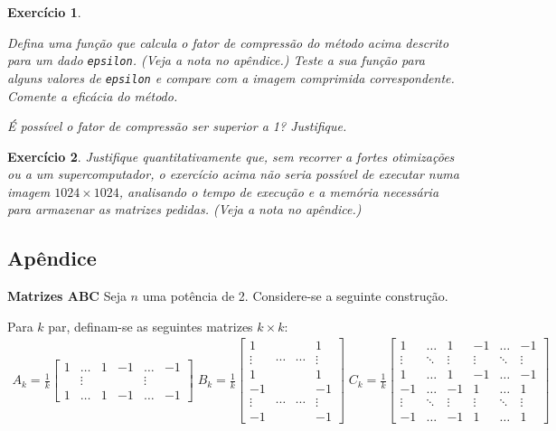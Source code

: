 \documentclass{article}
\newtheorem{ex}{Exercício}[section]
\begin{document}
\begin{ex}\label{exratio}

Defina uma função que calcula o fator de compressão do método acima descrito para um dado \texttt{epsilon}. (Veja a nota no apêndice.) Teste a sua função para alguns valores de \texttt{epsilon} e compare com a imagem comprimida correspondente. Comente a eficácia do método.

É possível o fator de compressão ser superior a 1? Justifique.
\end{ex}

\begin{ex}\label{experformance}
Justifique quantitativamente que, sem recorrer a fortes otimizações ou a um supercomputador, o exercício acima não seria possível de executar numa imagem $1024 \times 1024$, analisando o tempo de execução e a memória necessária para armazenar as matrizes pedidas. (Veja a nota no apêndice.) 

\end{ex}

\subsection{Apêndice}
\textbf{Matrizes ABC}
Seja $n$ uma potência de 2. Considere-se a seguinte construção.

Para $k$ par, definam-se as seguintes matrizes $k \times k$:
\begin{gather*}
A_k = \frac1k \begin{bmatrix}
1 & \dots & 1 & -1 & \dots & -1\\
& \vdots & & &\vdots &\\
1 & \dots & 1 & -1 & \dots & -1
\end{bmatrix}
\;
B_k = \frac1k \begin{bmatrix}
1 & & & 1 \\
\vdots & \cdots & \cdots & \vdots \\
1 & & & 1\\
-1 & & & -1 \\
\vdots & \cdots & \cdots & \vdots \\
-1 & & & -1
\end{bmatrix}
\;
C_k = \frac1k \begin{bmatrix}
1 & \dots & 1 & -1 & \dots & -1\\
\vdots & \ddots & \vdots & \vdots & \ddots & \vdots\\
1 & \dots & 1 & -1 & \dots & -1\\
-1 & \dots & -1 & 1 & \dots & 1\\
\vdots & \ddots & \vdots & \vdots & \ddots & \vdots\\
-1 & \dots & -1 & 1 & \dots & 1
\end{bmatrix}
\end{gather*}
\end{document}
